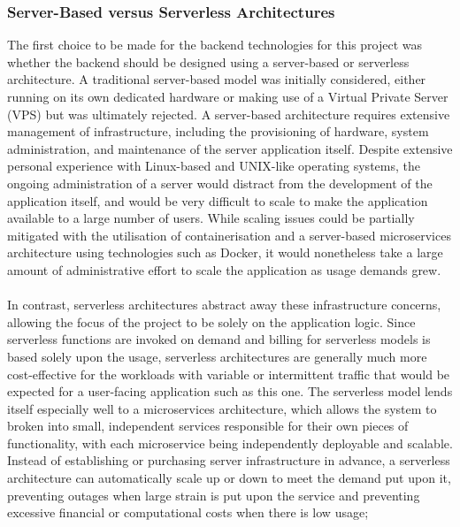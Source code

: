 \documentclass[a4paper,11pt]{report}
\begin{document}
\subsubsection{Server-Based versus Serverless Architectures}
The first choice to be made for the backend technologies for this project was whether the backend should be designed using a server-based or serverless architecture. 
A traditional server-based model was initially considered, either running on its own dedicated hardware or making use of a Virtual Private Server (VPS)\supercite{AWS:VPS} but was ultimately rejected.
A server-based architecture requires extensive management of infrastructure, including the provisioning of hardware, system administration, and maintenance of the server application itself.
Despite extensive personal experience with Linux-based and UNIX-like operating systems, the ongoing administration of a server would distract from the development of the application itself, and would be very difficult to scale to make the application available to a large number of users.
While scaling issues could be partially mitigated with the utilisation of containerisation and a server-based microservices architecture\supercite{IBM:Microservices, AWS:Microservices} using technologies such as Docker\supercite{DockerEngineDocs}, it would nonetheless take a large amount of administrative effort to scale the application as usage demands grew.
\\\\
In contrast, serverless architectures\supercite{digitalocean_serverless_2023, google_serverless_2025, aws_serverless_2025} abstract away these infrastructure concerns, allowing the focus of the project to be solely on the application logic.
Since serverless functions are invoked on demand and billing for serverless models is based solely upon the usage, serverless architectures are generally much more cost-effective for the workloads with variable or intermittent traffic that would be expected for a user-facing application such as this one.
The serverless model lends itself especially well to a microservices architecture, which allows the system to broken into small, independent services responsible for their own pieces of functionality, with each microservice being independently deployable and scalable.
Instead of establishing or purchasing server infrastructure in advance, a serverless architecture can automatically scale up or down to meet the demand put upon it, preventing outages when large strain is put upon the service and preventing excessive financial or computational costs when there is low usage;
\end{document}
